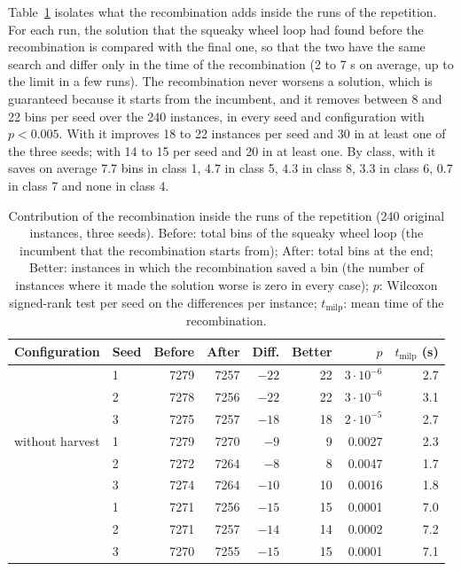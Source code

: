 Table~\ref{tab:e-within} isolates what the recombination adds inside the runs of the repetition. For each run, the solution
that the squeaky wheel loop had found before the recombination is compared with the final one, so that the two have the same search and differ only in the time of the recombination (2 to 7 s on average, up to the limit in a few runs).
The recombination never worsens a solution, which is guaranteed because it starts from the incumbent, and it removes between 8 and 22 bins per seed over the 240 instances, in every seed and configuration with $p<0.005$. With \cfgfast{}
it improves 18 to 22 instances per seed and 30 in at least one of the three seeds; with \cfgbal{} 14 to 15 per seed and 20 in at least one. By class, with \cfgfast{} it saves on average 7.7 bins in class 1, 4.7 in class 5, 4.3 in class 8, 3.3 in class 6, 0.7 in
class 7 and none in class 4.

\begin{table}[t]
\centering
\small\setlength{\tabcolsep}{4pt}
\caption{Contribution of the recombination inside the runs of the repetition (240 original instances, three seeds). Before: total bins of the squeaky wheel loop (the incumbent that the
recombination starts from); After: total bins at the end; Better: instances in which the recombination saved a bin (the number of instances where it made the solution worse is zero in every case);
$p$: Wilcoxon signed-rank test per seed on the differences per instance; $t_{\mathrm{milp}}$: mean time of the recombination.}
\label{tab:e-within}
\begin{tabular}{@{}llrrrrrr@{}}
\toprule
Configuration & Seed & Before & After & Diff. & Better & $p$ & $t_{\mathrm{milp}}$ (s)\\
\midrule
\cfgfast{} & 1 & 7279 & 7257 & $-22$ & 22 & $3\cdot 10^{-6}$ & 2.7\\
 & 2 & 7278 & 7256 & $-22$ & 22 & $3\cdot 10^{-6}$ & 3.1\\
 & 3 & 7275 & 7257 & $-18$ & 18 & $2\cdot 10^{-5}$ & 2.7\\
\cfgfast{} without harvest & 1 & 7279 & 7270 & $-9$ & 9 & 0.0027 & 2.3\\
 & 2 & 7272 & 7264 & $-8$ & 8 & 0.0047 & 1.7\\
 & 3 & 7274 & 7264 & $-10$ & 10 & 0.0016 & 1.8\\
\cfgbal{} & 1 & 7271 & 7256 & $-15$ & 15 & 0.0001 & 7.0\\
 & 2 & 7271 & 7257 & $-14$ & 14 & 0.0002 & 7.2\\
 & 3 & 7270 & 7255 & $-15$ & 15 & 0.0001 & 7.1\\
\bottomrule
\end{tabular}
\end{table}

